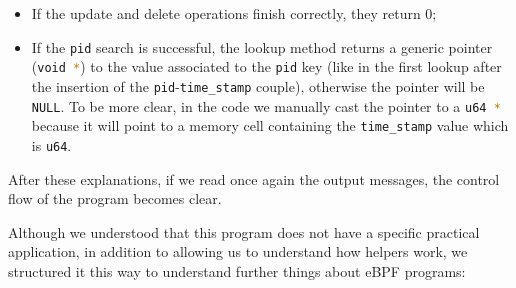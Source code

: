 \begin{itemize}
	\item 
		If the update and delete operations finish correctly, they return 0;
	\item 
		If the \colorbox{backcolour}{\lstinline[style=commandline, language=bash, breaklines=true]|pid|} search is successful, the lookup method returns a generic pointer (\colorbox{backcolour}{\lstinline[style=commandline, language=bash, breaklines=true]|void *|}) to the value associated to the \colorbox{backcolour}{\lstinline[style=commandline, language=bash, breaklines=true]|pid|} key (like in the first lookup after the insertion of the \colorbox{backcolour}{\lstinline[style=commandline, language=bash, breaklines=true]|pid|}-\colorbox{backcolour}{\lstinline[style=commandline, language=bash, breaklines=true]|time_stamp|} couple), otherwise the pointer will be \colorbox{backcolour}{\lstinline[style=commandline, language=bash, breaklines=true]|NULL|}.
		To be more clear, in the code we manually cast the pointer to a \colorbox{backcolour}{\lstinline[style=commandline, language=bash, breaklines=true]|u64 *|} because it will point to a memory cell containing the \colorbox{backcolour}{\lstinline[style=commandline, language=bash, breaklines=true]|time_stamp|} value which is \colorbox{backcolour}{\lstinline[style=commandline, language=bash, breaklines=true]|u64|}.
\end{itemize}

After these explanations, if we read once again the output messages, the control flow of the program becomes clear.

Although we understood that this program does not have a specific practical application, in addition to allowing us to understand how helpers work, we structured it this way to understand further things about eBPF programs:

